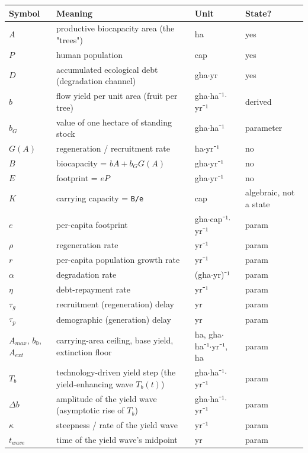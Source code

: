 \documentclass[11pt]{article}
\begin{document}
\begin{table}[htbp]
\centering
\small
\begin{tabularx}{\textwidth}{>{\raggedright\arraybackslash}X>{\raggedright\arraybackslash}X>{\raggedright\arraybackslash}X>{\raggedright\arraybackslash}X}
\toprule
Symbol & Meaning & Unit & State? \\
\midrule
$A$ & productive biocapacity area (the "trees") & ha & yes \\
$P$ & human population & cap & yes \\
$D$ & accumulated ecological debt (degradation channel) & gha\ensuremath{\cdot{}}yr & yes \\
$b$ & flow yield per unit area (fruit per tree) & gha\ensuremath{\cdot{}}ha⁻¹\ensuremath{\cdot{}}yr⁻¹ & derived \\
$b_{G}$ & value of one hectare of standing stock & gha\ensuremath{\cdot{}}ha⁻¹ & parameter \\
$G(A)$ & regeneration / recruitment rate & ha\ensuremath{\cdot{}}yr⁻¹ & no \\
$B$ & biocapacity = $bA + b_{G} G(A)$ & gha\ensuremath{\cdot{}}yr⁻¹ & no \\
$E$ & footprint = $eP$ & gha\ensuremath{\cdot{}}yr⁻¹ & no \\
$K$ & carrying capacity = \texttt{B/e} & cap & algebraic, not a state \\
$e$ & per-capita footprint & gha\ensuremath{\cdot{}}cap⁻¹\ensuremath{\cdot{}}yr⁻¹ & param \\
$\rho{}$ & regeneration rate & yr⁻¹ & param \\
$r$ & per-capita population growth rate & yr⁻¹ & param \\
$\alpha{}$ & degradation rate & (gha\ensuremath{\cdot{}}yr)⁻¹ & param \\
$\eta{}$ & debt-repayment rate & yr⁻¹ & param \\
$\tau{}_{g}$ & recruitment (regeneration) delay & yr & param \\
$\tau{}_{p}$ & demographic (generation) delay & yr & param \\
$A_{max}$, $b_{0}$, $A_{ext}$ & carrying-area ceiling, base yield, extinction floor & ha, gha\ensuremath{\cdot{}}ha⁻¹\ensuremath{\cdot{}}yr⁻¹, ha & param \\
$T_{b}$ & technology-driven yield step (the yield-enhancing wave $T_{b}(t)$) & gha\ensuremath{\cdot{}}ha⁻¹\ensuremath{\cdot{}}yr⁻¹ & param \\
$\Delta{}b$ & amplitude of the yield wave (asymptotic rise of $T_{b}$) & gha\ensuremath{\cdot{}}ha⁻¹\ensuremath{\cdot{}}yr⁻¹ & param \\
$\kappa{}$ & steepness / rate of the yield wave & yr⁻¹ & param \\
$t_{wave}$ & time of the yield wave's midpoint & yr & param \\
\bottomrule
\end{tabularx}
\end{table}
\end{document}

